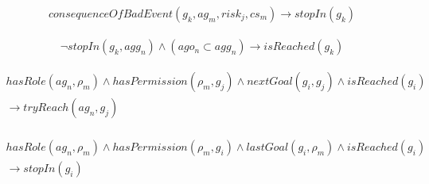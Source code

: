 \begin{eqnarray}\label{rel14}
	consequenceOfBadEvent(g_k,ag_m,risk_j,cs_m) \to stopIn(g_k)
\end{eqnarray}

\begin{eqnarray}\label{rel15}
	\neg stopIn(g_k,agg_n) \wedge (ago_n \subset agg_n) \to isReached(g_k)
\end{eqnarray}

\begin{eqnarray}\label{rel16}
	hasRole(ag_n,\rho_m) \wedge hasPermission(\rho_m,g_j) \wedge nextGoal(g_i,g_j) \wedge isReached(g_i) \nonumber \\
	\to tryReach(ag_n,g_j) \nonumber \\
\end{eqnarray}

\begin{eqnarray}\label{rel16}
	hasRole(ag_n,\rho_m) \wedge hasPermission(\rho_m,g_i) \wedge lastGoal(g_i,\rho_m) \wedge isReached(g_i) \nonumber \\
	\to stopIn(g_i) \nonumber \\
\end{eqnarray}